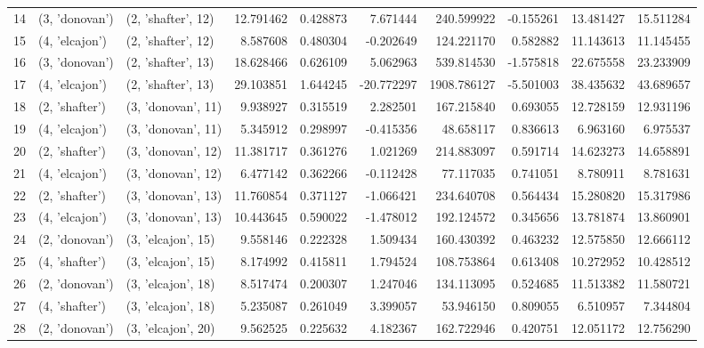 \begin{tabular}{lllrrrrrrr}
14 &   (3, 'donovan') &  (2, 'shafter', 12) &  12.791462 &  0.428873 &   7.671444 &   240.599922 & -0.155261 &  13.481427 &  15.511284 \\
15 &   (4, 'elcajon') &  (2, 'shafter', 12) &   8.587608 &  0.480304 &  -0.202649 &   124.221170 &  0.582882 &  11.143613 &  11.145455 \\
16 &   (3, 'donovan') &  (2, 'shafter', 13) &  18.628466 &  0.626109 &   5.062963 &   539.814530 & -1.575818 &  22.675558 &  23.233909 \\
17 &   (4, 'elcajon') &  (2, 'shafter', 13) &  29.103851 &  1.644245 & -20.772297 &  1908.786127 & -5.501003 &  38.435632 &  43.689657 \\
18 &   (2, 'shafter') &  (3, 'donovan', 11) &   9.938927 &  0.315519 &   2.282501 &   167.215840 &  0.693055 &  12.728159 &  12.931196 \\
19 &   (4, 'elcajon') &  (3, 'donovan', 11) &   5.345912 &  0.298997 &  -0.415356 &    48.658117 &  0.836613 &   6.963160 &   6.975537 \\
20 &   (2, 'shafter') &  (3, 'donovan', 12) &  11.381717 &  0.361276 &   1.021269 &   214.883097 &  0.591714 &  14.623273 &  14.658891 \\
21 &   (4, 'elcajon') &  (3, 'donovan', 12) &   6.477142 &  0.362266 &  -0.112428 &    77.117035 &  0.741051 &   8.780911 &   8.781631 \\
22 &   (2, 'shafter') &  (3, 'donovan', 13) &  11.760854 &  0.371127 &  -1.066421 &   234.640708 &  0.564434 &  15.280820 &  15.317986 \\
23 &   (4, 'elcajon') &  (3, 'donovan', 13) &  10.443645 &  0.590022 &  -1.478012 &   192.124572 &  0.345656 &  13.781874 &  13.860901 \\
24 &   (2, 'donovan') &  (3, 'elcajon', 15) &   9.558146 &  0.222328 &   1.509434 &   160.430392 &  0.463232 &  12.575850 &  12.666112 \\
25 &   (4, 'shafter') &  (3, 'elcajon', 15) &   8.174992 &  0.415811 &   1.794524 &   108.753864 &  0.613408 &  10.272952 &  10.428512 \\
26 &   (2, 'donovan') &  (3, 'elcajon', 18) &   8.517474 &  0.200307 &   1.247046 &   134.113095 &  0.524685 &  11.513382 &  11.580721 \\
27 &   (4, 'shafter') &  (3, 'elcajon', 18) &   5.235087 &  0.261049 &   3.399057 &    53.946150 &  0.809055 &   6.510957 &   7.344804 \\
28 &   (2, 'donovan') &  (3, 'elcajon', 20) &   9.562525 &  0.225632 &   4.182367 &   162.722946 &  0.420751 &  12.051172 &  12.756290 \\

\end{tabular}
